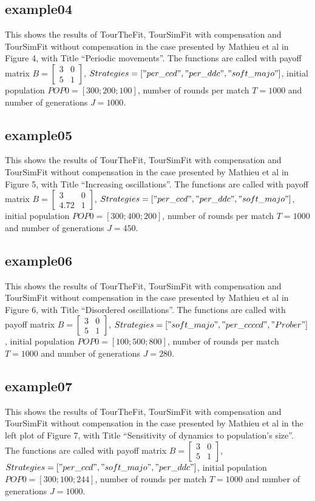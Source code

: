 \subsection{example04}
This shows the results of TourTheFit, TourSimFit with compensation and TourSimFit without compensation in the case presented by Mathieu et al in Figure 4, with Title ``Periodic movements''. The functions are called with payoff matrix $B = \begin{bmatrix} 3 & 0 \\ 5 & 1 \end{bmatrix}$, $Strategies = ["per\_ccd", "per\_ddc", "soft\_majo"]$, initial population $POP0 = [300; 200; 100]$, number of rounds per match $T = 1000$ and number of generations $J = 1000$.

\subsection{example05}
This shows the results of TourTheFit, TourSimFit with compensation and TourSimFit without compensation in the case presented by Mathieu et al in Figure 5, with Title ``Increasing oscillations''. The functions are called with payoff matrix $B = \begin{bmatrix} 3 & 0 \\ 4.72 & 1 \end{bmatrix}$, $Strategies = ["per\_ccd", "per\_ddc", "soft\_majo"]$, initial population $POP0 = [300; 400; 200]$, number of rounds per match $T = 1000$ and number of generations $J = 450$.

\subsection{example06}
This shows the results of TourTheFit, TourSimFit with compensation and TourSimFit without compensation in the case presented by Mathieu et al in Figure 6, with Title ``Disordered oscillations''. The functions are called with payoff matrix $B = \begin{bmatrix} 3 & 0 \\ 5 & 1 \end{bmatrix}$, $Strategies = ["soft\_majo", "per\_ccccd", "Prober"]$, initial population $POP0 = [100; 500; 800]$, number of rounds per match $T = 1000$ and number of generations $J = 280$.

\subsection{example07}
This shows the results of TourTheFit, TourSimFit with compensation and TourSimFit without compensation in the case presented by Mathieu et al in the left plot of Figure 7, with Title ``Sensitivity of dynamics to population's size''. The functions are called with payoff matrix $B = \begin{bmatrix} 3 & 0 \\ 5 & 1 \end{bmatrix}$, $Strategies = ["per\_ccd", "soft\_majo", "per\_ddc"]$, initial population $POP0 = [300; 100; 244]$, number of rounds per match $T = 1000$ and number of generations $J = 1000$.

